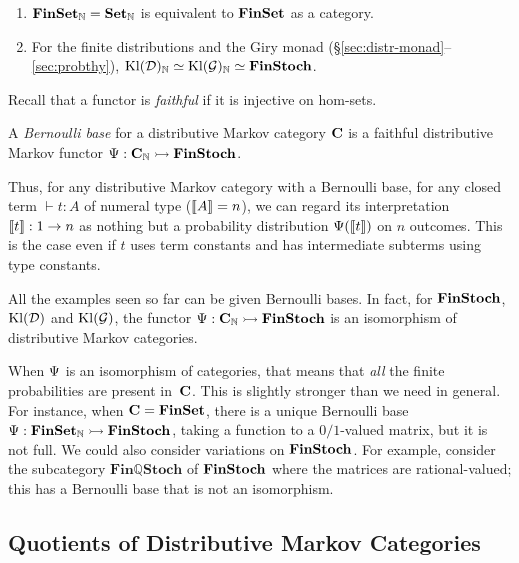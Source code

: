 \begin{example}\label{ex:bernoulli-base}\begin{enumerate}
  \item $\mathbf{FinSet}_{\mathbb{N}} = \mathbf{Set}_{\mathbb{N}}$ is equivalent to $\mathbf{FinSet}$ as a category.
  \item For the finite distributions and the Giry monad (\S\ref{sec:distr-monad}--\ref{sec:probthy}), $\mathrm{Kl}(\mathcal{D})_{\mathbb{N}}\simeq \mathrm{Kl}(\mathcal{G})_{\mathbb{N}}\simeq \mathbf{FinStoch}$.\end{enumerate}
\end{example}

Recall that a functor is \emph{faithful} if it is injective on hom-sets.
\newcommand{\faithfulfr}{\rightarrowtail}
\begin{definition}
  A \emph{Bernoulli base} for a distributive Markov category $\mathbf{C}$
  is a faithful distributive Markov functor $\bbase:\CatA_\NN\faithfulfr \FinStoch$.
\end{definition}
Thus, for any distributive Markov category with a Bernoulli base, 
for any closed term $\vdash t : A$ of numeral type ($\llbracket A\rrbracket=n$), we
can regard its interpretation $\llbracket t\rrbracket:1\to n$ as nothing but 
a probability distribution $\Psi(\llbracket t\rrbracket)$ on $n$ outcomes. This is the case even if
$t$ uses term constants and has intermediate subterms using type
constants. 

\begin{example}
  All the examples seen so far can be given Bernoulli bases. In fact, for $\mathbf{FinStoch}$, $\mathrm{Kl}(\mathcal{D})$ and $\mathrm{Kl}(\mathcal{G})$,
  the functor $\bbase:\CatA_\NN\faithfulfr \FinStoch$ is an isomorphism of distributive Markov categories.
\end{example}
When $\Psi$ is an isomorphism of categories, that means that \emph{all} the finite probabilities are present in~$\mathbf{C}$. This is slightly stronger than we need in general. 
For instance, when $\mathbf{C}=\mathbf{FinSet}$, there is a unique Bernoulli base $\bbase:\FinSet_\NN\faithfulfr\FinStoch$, taking a function to a $0/1$-valued matrix,
but it is not full.
We could also consider variations on $\mathbf{FinStoch}$. For example,
consider the subcategory $\mathbf{Fin\mathbb{Q}Stoch}$ of $\mathbf{FinStoch}$ where the matrices are rational-valued;
this has a Bernoulli base that is not an isomorphism.

\subsection{Quotients of Distributive Markov Categories}\label{sec:quotients}
\newcommand{\Ctx}{\mathcal{C}}

